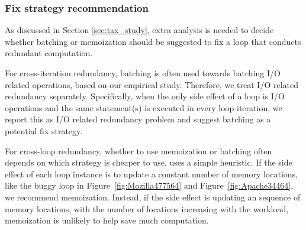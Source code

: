 

\subsubsection{Fix strategy recommendation}
\label{sec:redundant_fix}
As discussed in Section \ref{sec:tax_study}, extra analysis is needed to
decide whether batching or memoization should be suggested to fix a 
loop that conducts redundant computation.

For cross-iteration redundancy, batching is often used towards
batching I/O related operations, based on our empirical study. 
Therefore, we treat I/O related redundancy separately.
Specifically, when the only side effect of a loop is I/O operations
and the same statement(s) is executed in every loop iteration, we report this
as I/O related redundancy problem and suggest batching as a potential fix
strategy. 

For cross-loop redundancy, whether to use memoization or batching often
depends on which strategy is cheaper to use. \Tool uses a simple
heuristic. If 
the side effect of each loop instance is to update 
a constant number of memory locations, like the 
buggy loop in Figure~\ref{fig:Mozilla477564} and Figure~\ref{fig:Apache34464}, 
we recommend memoization. Instead, if the side effect is updating 
an sequence of memory locations, with the number of locations increasing
with the workload, memoization is unlikely to help save much computation.





